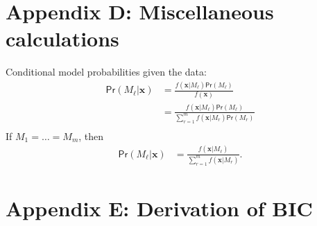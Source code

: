 \documentclass{uwstat572}
\newcommand*\ba{\[ \begin{aligned}}
\newcommand*\ea{\end{aligned} \]}
\newcommand*\bx{\mathbf{x}}
\renewcommand\;{\,}
\renewcommand\Pr[1]{ \mathsf{Pr}\left(#1\right) }
\begin{document}
\section*{Appendix D: Miscellaneous calculations}
Conditional model probabilities given the data:
\ba
\Pr{M_\ell | \bx} & = \frac{f(\bx | M_\ell) \Pr{M_\ell}}{ f(\bx) } \\
	& = \frac{f(\bx | M_\ell) \Pr{M_\ell}}{ \sum_{r = 1}^m f(\bx | M_r) \Pr{M_r} } \\
\ea
If $M_1 = \dotsc = M_m$, then
\ba
\Pr{M_\ell | \bx} & = \frac{f(\bx | M_\ell)}{ \sum_{r=1}^m f(\bx | M_r) }.
\ea

\section*{Appendix E: Derivation of BIC}
\end{document}
